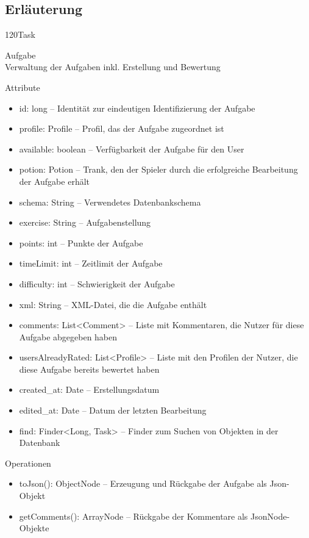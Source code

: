 \subsection{Erläuterung}
\begin{class}{120}{Task}
\item[Aufgabe]~\\
Verwaltung der Aufgaben inkl. Erstellung und Bewertung
\item[Attribute]~\\
\begin{itemize}
\item id: long -- Identität zur eindeutigen Identifizierung der Aufgabe
\item profile: Profile -- Profil, das der Aufgabe zugeordnet ist
\item available: boolean -- Verfügbarkeit der Aufgabe für den User
\item potion: Potion -- Trank, den der Spieler durch die erfolgreiche Bearbeitung der Aufgabe erhält
\item schema: String -- Verwendetes Datenbankschema
\item exercise: String -- Aufgabenstellung
\item points: int -- Punkte der Aufgabe
\item timeLimit: int -- Zeitlimit der Aufgabe
\item difficulty: int -- Schwierigkeit der Aufgabe
\item xml: String -- XML-Datei, die die Aufgabe enthält
\item comments: List<Comment> -- Liste mit Kommentaren, die Nutzer für diese Aufgabe abgegeben haben
\item usersAlreadyRated: List<Profile> -- Liste mit den Profilen der Nutzer, die diese Aufgabe bereits bewertet haben
\item created\_at: Date -- Erstellungsdatum
\item edited\_at: Date -- Datum der letzten Bearbeitung
\item find: Finder<Long, Task> -- Finder zum Suchen von Objekten in der Datenbank
\end{itemize}
\item[Operationen]~\\
\begin{itemize}
\item toJson(): ObjectNode -- Erzeugung und Rückgabe der Aufgabe als Json-Objekt
\item getComments(): ArrayNode -- Rückgabe der Kommentare als JsonNode-Objekte

\end{itemize}
\end{class}
